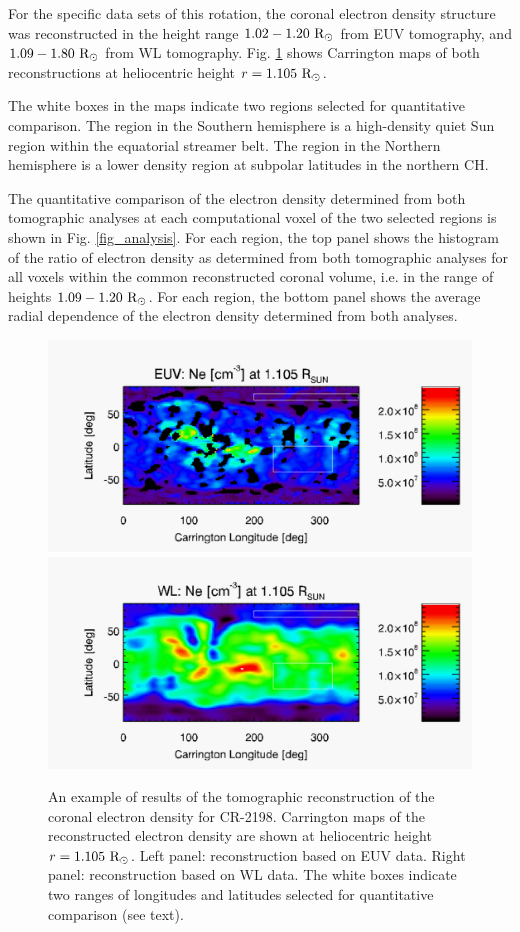 \documentclass[baaa]{baaa}
\begin{document}
For the specific data sets of this rotation, the coronal electron density structure was reconstructed in the height range $1.02-1.20~\rm{R}_\odot$ from EUV tomography, and $1.09-1.80~\rm{R}_\odot$ from WL tomography. Fig. \ref{fig_maps} shows Carrington maps of both reconstructions at heliocentric height $r=1.105~\rm{R}_\odot$. 

The white boxes in the maps indicate two regions selected for quantitative comparison. The region in the Southern hemisphere is a high-density quiet Sun region within the equatorial streamer belt. The region in the Northern hemisphere is a lower density region at subpolar latitudes in the northern CH.

The quantitative comparison of the electron density determined from both tomographic {analyses} at each computational voxel of the two selected regions is shown in Fig. \ref{fig_analysis}. For each region, the top panel shows the histogram of the ratio of electron density as determined from both tomographic {analyses} for all voxels within the common reconstructed coronal volume, i.e. in the range of heights $1.09-1.20~\rm{R}_\odot$.
For each region, the bottom panel shows the average radial dependence of the electron density determined from both {analyses}.

\begin{figure}[t]
  \centering
  \includegraphics[width=\columnwidth]{map_ne_aia.pdf}
  \includegraphics[width=\columnwidth]{map_ne_kcor.pdf}
  \caption{{An example of results of the tomographic reconstruction of the coronal electron density} for CR-2198. Carrington maps of the reconstructed electron density are shown at heliocentric height $r=1.105~\rm{R}_\odot$. Left panel: reconstruction based on EUV data. Right panel: reconstruction based on WL data. The white boxes indicate two ranges of longitudes and latitudes selected for quantitative comparison (see text).}
  \label{fig_maps}
\end{figure}
\end{document}
